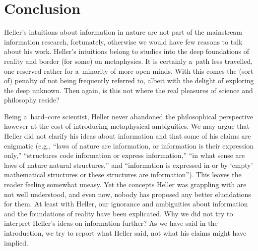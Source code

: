 \section{Conclusion}

Heller's intuitions about information in nature are not part of the mainstream information research, fortunately, otherwise we would have few reasons to talk about his work. Heller's intuitions belong to studies into the deep foundations of reality and border (for some) on metaphysics. It is certainly a~path less travelled, one reserved rather for a~minority of more open minds. With this comes the (sort of) penalty of not being frequently referred to, albeit with the delight of exploring the deep unknown. Then again, is this not where the real pleasures of science and philosophy reside?



Being a~hard–core scientist, Heller never abandoned the philosophical perspective 
\parencites[called by himself ‘philosophy in sciencesee][]{heller_how_2019}[][]{polak_philosophy_2019}[][]{polak_beyond_2022} %
 however at the cost of introducing metaphysical ambiguities. We may argue that Heller did not clarify his ideas about information and that some of his claims are enigmatic (e.g., ``laws of nature are information, or information is their expression only,'' ``structures code information or express information,'' ``in what sense are laws of nature natural structures,'' and ``information is expressed in or by ‘empty' mathematical structures or these structures are information''). This leaves the reader feeling somewhat uneasy. Yet the concepts Heller was grappling with are not well understood, and even now, nobody has proposed any better elucidations for them. At least with Heller, our ignorance and ambiguities about information and the foundations of reality have been explicated. Why we did not try to interpret Heller's ideas on information further? As we have said in the introduction, we try to report what Heller said, not what his claims might have implied.



